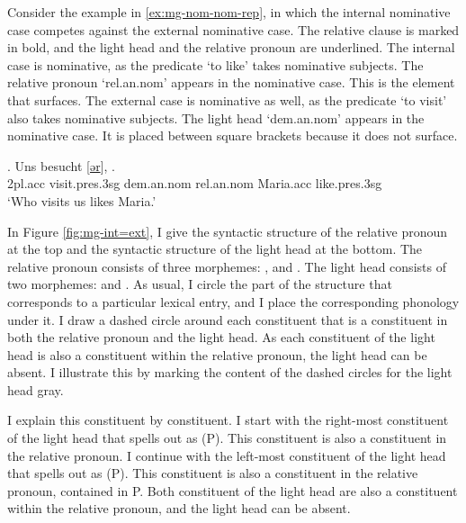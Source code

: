 Consider the example in \ref{ex:mg-nom-nom-rep}, in which the internal nominative case competes against the external nominative case. The relative clause is marked in bold, and the light head and the relative pronoun are underlined.
The internal case is nominative, as the predicate  `to like' takes nominative subjects. The relative pronoun  `\ac{rel}.\ac{an}.\ac{nom}' appears in the nominative case. This is the element that surfaces.
The external case is nominative as well, as the predicate  `to visit' also takes nominative subjects. The light head  `\ac{dem}.\ac{an}.\ac{nom}' appears in the nominative case. It is placed between square brackets because it does not surface.

\exg. Uns besucht [\underline{ər}], \underline{}  .\\
 2\ac{pl}.\ac{acc} visit.\ac{pres}.3\ac{sg}\scsub{[nom]} \ac{dem}.\ac{an}.\ac{nom} \ac{rel}.\ac{an}.\ac{nom} Maria.\ac{acc} like.\ac{pres}.3\ac{sg}\scsub{[nom]}\\
 `Who visits us likes Maria.' \label{ex:mg-nom-nom-rep}

In Figure \ref{fig:mg-int=ext}, I give the syntactic structure of the relative pronoun at the top and the syntactic structure of the light head at the bottom.
The relative pronoun consists of three morphemes: ,  and .
The light head consists of two morphemes:  and .
As usual, I circle the part of the structure that corresponds to a particular lexical entry, and I place the corresponding phonology under it.
I draw a dashed circle around each constituent that is a constituent in both the relative pronoun and the light head.
As each constituent of the light head is also a constituent within the relative pronoun, the light head can be absent. I illustrate this by marking the content of the dashed circles for the light head gray.

I explain this constituent by constituent.
I start with the right-most constituent of the light head that spells out as  (P). This constituent is also a constituent in the relative pronoun.
I continue with the left-most constituent of the light head that spells out as  (P). This constituent is also a constituent in the relative pronoun, contained in P.
Both constituent of the light head are also a constituent within the relative pronoun, and the light head can be absent.


